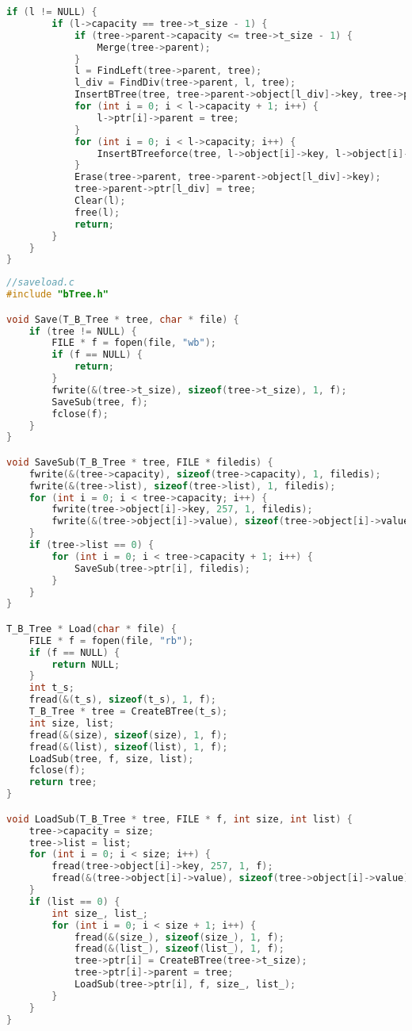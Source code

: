 \begin{lstlisting}[language=C]
    if (l != NULL) {
        if (l->capacity == tree->t_size - 1) {
            if (tree->parent->capacity <= tree->t_size - 1) {
                Merge(tree->parent);
            }
            l = FindLeft(tree->parent, tree);
            l_div = FindDiv(tree->parent, l, tree);
            InsertBTree(tree, tree->parent->object[l_div]->key, tree->parent->object[l_div]->value, NULL, NULL);
            for (int i = 0; i < l->capacity + 1; i++) {
                l->ptr[i]->parent = tree;
            }
            for (int i = 0; i < l->capacity; i++) {
                InsertBTreeforce(tree, l->object[i]->key, l->object[i]->value, l->ptr[i], l->ptr[i + 1]);
            }
            Erase(tree->parent, tree->parent->object[l_div]->key);
            tree->parent->ptr[l_div] = tree;
            Clear(l);
            free(l);
            return;
        }
    }
}
\end{lstlisting}

\begin{lstlisting}[language=C]
//saveload.c
#include "bTree.h"

void Save(T_B_Tree * tree, char * file) {
    if (tree != NULL) {
        FILE * f = fopen(file, "wb");
        if (f == NULL) {
            return;
        }
        fwrite(&(tree->t_size), sizeof(tree->t_size), 1, f);
        SaveSub(tree, f);
        fclose(f);
    }
}

void SaveSub(T_B_Tree * tree, FILE * filedis) {
    fwrite(&(tree->capacity), sizeof(tree->capacity), 1, filedis);
    fwrite(&(tree->list), sizeof(tree->list), 1, filedis);
    for (int i = 0; i < tree->capacity; i++) {
        fwrite(tree->object[i]->key, 257, 1, filedis);
        fwrite(&(tree->object[i]->value), sizeof(tree->object[i]->value), 1, filedis);
    }
    if (tree->list == 0) {
        for (int i = 0; i < tree->capacity + 1; i++) {
            SaveSub(tree->ptr[i], filedis);
        }
    }
}

T_B_Tree * Load(char * file) {
    FILE * f = fopen(file, "rb");
    if (f == NULL) {
        return NULL;
    }
    int t_s;
    fread(&(t_s), sizeof(t_s), 1, f);
    T_B_Tree * tree = CreateBTree(t_s);
    int size, list;
    fread(&(size), sizeof(size), 1, f);
    fread(&(list), sizeof(list), 1, f);
    LoadSub(tree, f, size, list);
    fclose(f);
    return tree;
}

void LoadSub(T_B_Tree * tree, FILE * f, int size, int list) {
    tree->capacity = size;
    tree->list = list;
    for (int i = 0; i < size; i++) {
        fread(tree->object[i]->key, 257, 1, f);
        fread(&(tree->object[i]->value), sizeof(tree->object[i]->value), 1, f);
    }
    if (list == 0) {
        int size_, list_;
        for (int i = 0; i < size + 1; i++) {
            fread(&(size_), sizeof(size_), 1, f);
            fread(&(list_), sizeof(list_), 1, f);
            tree->ptr[i] = CreateBTree(tree->t_size);
            tree->ptr[i]->parent = tree;
            LoadSub(tree->ptr[i], f, size_, list_);
        }
    }
}
\end{lstlisting}

